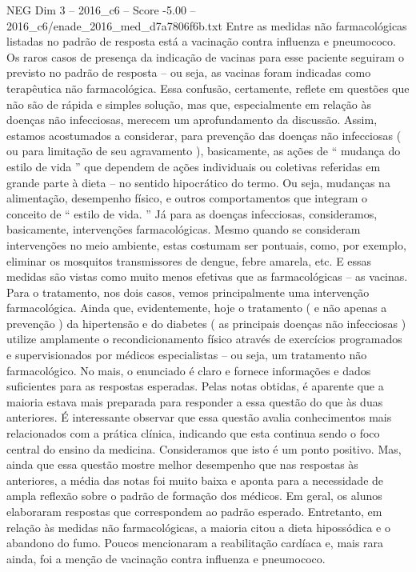 \begin{textsample}{NEG Dim 3 – 2016\_c6 – Score -5.00 – 2016\_c6/enade\_2016\_med\_d7a7806f6b.txt}
Entre as medidas não farmacológicas listadas no padrão de resposta está a vacinação contra influenza e pneumococo.
Os raros casos de presença da indicação de vacinas para esse paciente seguiram o previsto no padrão de resposta – ou seja, as vacinas foram indicadas como terapêutica não farmacológica.
Essa confusão, certamente, reflete em questões que não são de rápida e simples solução, mas que, especialmente em relação às doenças não infecciosas, merecem um aprofundamento da discussão.
Assim, estamos acostumados a considerar, para prevenção das doenças não infecciosas ( ou para limitação de seu agravamento ), basicamente, as ações de “ mudança do estilo de vida ” que dependem de ações individuais ou coletivas referidas em grande parte à dieta – no sentido hipocrático do termo.
Ou seja, mudanças na alimentação, desempenho físico, e outros comportamentos que integram o conceito de “ estilo de vida. ” Já para as doenças infecciosas, consideramos, basicamente, intervenções farmacológicas.
Mesmo quando se consideram intervenções no meio ambiente, estas costumam ser pontuais, como, por exemplo, eliminar os mosquitos transmissores de dengue, febre amarela, etc.
E essas medidas são vistas como muito menos efetivas que as farmacológicas – as vacinas.
Para o tratamento, nos dois casos, vemos principalmente uma intervenção farmacológica.
Ainda que, evidentemente, hoje o tratamento ( e não apenas a prevenção ) da hipertensão e do diabetes ( as principais doenças não infecciosas ) utilize amplamente o recondicionamento físico através de exercícios programados e supervisionados por médicos especialistas – ou seja, um tratamento não farmacológico.
No mais, o enunciado é claro e fornece informações e dados suficientes para as respostas esperadas.
Pelas notas obtidas, é aparente que a maioria estava mais preparada para responder a essa questão do que às duas anteriores.
É interessante observar que essa questão avalia conhecimentos mais relacionados com a prática clínica, indicando que esta continua sendo o foco central do ensino da medicina.
Consideramos que isto é um ponto positivo.
Mas, ainda que essa questão mostre melhor desempenho que nas respostas às anteriores, a média das notas foi muito baixa e aponta para a necessidade de ampla reflexão sobre o padrão de formação dos médicos.
Em geral, os alunos elaboraram respostas que correspondem ao padrão esperado.
Entretanto, em relação às medidas não farmacológicas, a maioria citou a dieta hipossódica e o abandono do fumo.
Poucos mencionaram a reabilitação cardíaca e, mais rara ainda, foi a menção de vacinação contra influenza e pneumococo.

\end{textsample}
